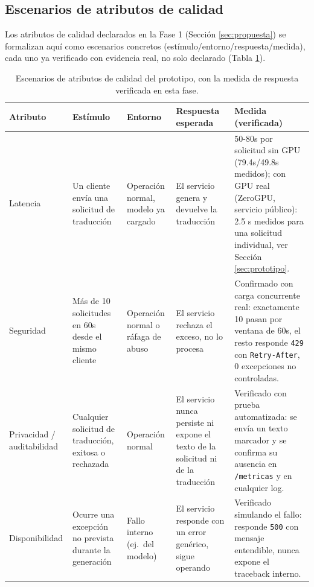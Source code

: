 \documentclass[11pt,a4paper]{article}
\begin{document}
\subsection{Escenarios de atributos de calidad}
\label{sec:escenarios-calidad}

Los atributos de calidad declarados en la Fase 1 (Sección \ref{sec:propuesta}) se formalizan aquí como escenarios concretos (estímulo/entorno/respuesta/medida), cada uno ya verificado con evidencia real, no solo declarado (Tabla \ref{tab:escenarios}).

\begin{table}[h]
\centering
\scriptsize
\begingroup
\setlength{\tabcolsep}{3pt}
\begin{tabular}{p{2.0cm}p{2.5cm}p{2.5cm}p{3.5cm}p{3.5cm}}
\toprule
\textbf{Atributo} & \textbf{Estímulo} & \textbf{Entorno} & \textbf{Respuesta esperada} & \textbf{Medida (verificada)} \\
\midrule
Latencia & Un cliente envía una solicitud de traducción & Operación normal, modelo ya cargado & El servicio genera y devuelve la traducción & 50-80s por solicitud sin GPU (79.4s/49.8s medidos); con GPU real (ZeroGPU, servicio público): 2.5 s medidos para una solicitud individual, ver Sección \ref{sec:prototipo}. \\
\addlinespace
Seguridad & Más de 10 solicitudes en 60s desde el mismo cliente & Operación normal o ráfaga de abuso & El servicio rechaza el exceso, no lo procesa & Confirmado con carga concurrente real: exactamente 10 pasan por ventana de 60s, el resto responde \texttt{429} con \texttt{Retry-After}, 0 excepciones no controladas. \\
\addlinespace
Privacidad / auditabilidad & Cualquier solicitud de traducción, exitosa o rechazada & Operación normal & El servicio nunca persiste ni expone el texto de la solicitud ni de la traducción & Verificado con prueba automatizada: se envía un texto marcador y se confirma su ausencia en \texttt{/metricas} y en cualquier log. \\
\addlinespace
Disponibilidad & Ocurre una excepción no prevista durante la generación & Fallo interno (ej.\ del modelo) & El servicio responde con un error genérico, sigue operando & Verificado simulando el fallo: responde \texttt{500} con mensaje entendible, nunca expone el traceback interno. \\
\bottomrule
\end{tabular}
\endgroup
\caption{Escenarios de atributos de calidad del prototipo, con la medida de respuesta verificada en esta fase.}
\label{tab:escenarios}
\end{table}
\end{document}
